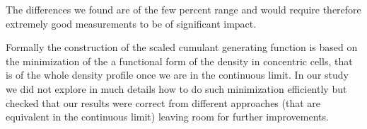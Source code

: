 \documentclass[twocolumn,aps,reprint, nofootinbib]{revtex4}
\begin{document}
The differences we found are of the few percent range and would require therefore extremely good measurements to be of significant impact. 



%
%

Formally the construction of the scaled cumulant generating function is based on the minimization of the a functional form of the density in concentric cells, that is of the whole density profile once we are in the continuous limit. In our study we did not explore in much details how to do such minimization efficiently but checked  that our results were correct from different approaches (that are equivalent in the continuous limit) leaving room for further improvements.

\end{document}
